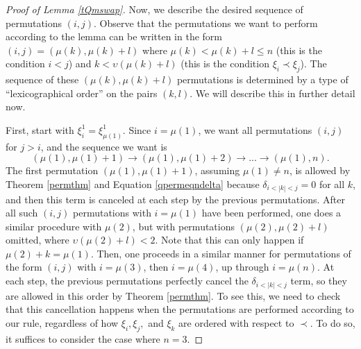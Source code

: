 \documentclass[11pt]{amsart}
\theoremstyle{plain}
\theoremstyle{definition}
\theoremstyle{remark}
\begin{document}
\begin{proof}[Proof of Lemma \ref{tQmswap}]
Now, we describe the desired sequence of permutations $(i,j)$. Observe that the permutations we want to perform according to the lemma can be written in the form $(i,j)=(\mu(k),\mu(k)+l)$ where $\mu(k)<\mu(k)+l\leq n$ (this is the condition $i<j$) and $k<\upsilon(\mu(k)+l)$ (this is the condition $\xi_i\prec \xi_j$). The sequence of these $(\mu(k),\mu(k)+l)$ permutations is determined by a type of ``lexicographical order'' on the pairs $(k,l)$. We will describe this in further detail now.

First, start with $\xi_i^1=\xi_{\mu(1)}^1$. Since $i=\mu(1)$, we want all permutations $(i,j)$ for $j>i$, and the sequence we want is
\[
(\mu(1),\mu(1)+1)\rightarrow(\mu(1),\mu(1)+2)\rightarrow...\rightarrow(\mu(1),n).
\]
The first permutation $(\mu(1),\mu(1)+1)$, assuming $\mu(1)\neq n$, is allowed by Theorem \ref{permthm} and Equation \ref{qpermeqndelta} because $\delta_{i<|k|<j}=0$ for all $k$, and then this term is canceled at each step by the previous permutations. After all such $(i,j)$ permutations with $i=\mu(1)$ have been performed, one does a similar procedure with $\mu(2)$, but with permutations $(\mu(2),\mu(2)+l)$ omitted, where $\upsilon(\mu(2)+l)<2$. Note that this can only happen if $\mu(2)+k=\mu(1)$. Then, one proceeds in a similar manner for permutations of the form $(i,j)$
with $i=\mu(3)$, then $i=\mu(4)$, up through $i=\mu(n)$. At each step, the previous permutations perfectly cancel the $\delta_{i<|k|<j}$ term, so they are allowed in this order by Theorem \ref{permthm}. To see this, we need to check that this cancellation happens when the permutations are performed according to our rule, regardless of how $\xi_i,\xi_j,$ and $\xi_k$ are ordered with respect to $\prec$. To do so, it suffices to consider the case where $n=3$.


\end{proof}
\end{document}
